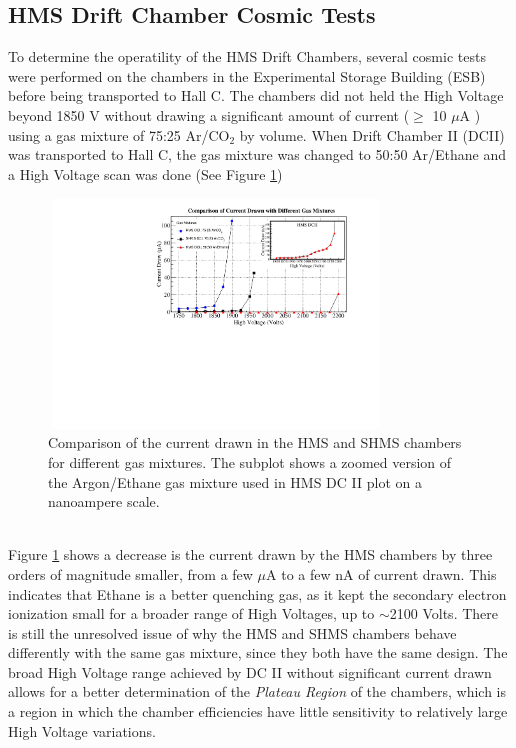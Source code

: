 \documentclass[letterpaper, 12 pt, conference]{ieeeconf}  %
\begin{document}
\subsection{HMS Drift Chamber Cosmic Tests}
\noindent To determine the operatility of the HMS Drift Chambers, several cosmic tests were performed on the chambers in the Experimental Storage Building (ESB) before being transported
to Hall C. The chambers did not held the High Voltage beyond 1850 V without drawing a significant amount of current ($\geq$ 10 $\mu$A ) using a gas mixture of 75:25 Ar/CO$_{2}$ by
volume. When Drift Chamber II (DCII) was transported to Hall C, the gas mixture was changed to 50:50 Ar/Ethane and a High Voltage scan was done (See Figure \ref{fig:current_draw})  
\begin{figure}[h!]
  \centering
  \includegraphics[width=3.5in, height=2.4in]{dc2_tests/gas_mix_current_drawn.pdf}
  \caption{Comparison of the current drawn in the HMS and SHMS chambers for different gas mixtures. The subplot shows a zoomed version of the Argon/Ethane gas mixture used in HMS DC II plot on a nanoampere scale.}
  \label{fig:current_draw}
\end{figure} \\
Figure \ref{fig:current_draw} shows a decrease is the current drawn by the HMS chambers by three orders of magnitude smaller, from a few $\mu$A to a few nA of current drawn. This
indicates that Ethane is a better quenching gas, as it kept the secondary electron ionization small for a broader range of High Voltages, up to $\sim$2100 Volts. There is still the
unresolved issue of why the HMS and SHMS chambers behave differently with the same gas mixture, since they both have the same design. The broad High Voltage range achieved by DC II without
significant current drawn allows for a better determination of the \textit{Plateau Region} of the chambers, which is a region in which the chamber efficiencies have little sensitivity
to relatively large High Voltage variations. \\
\end{document}
